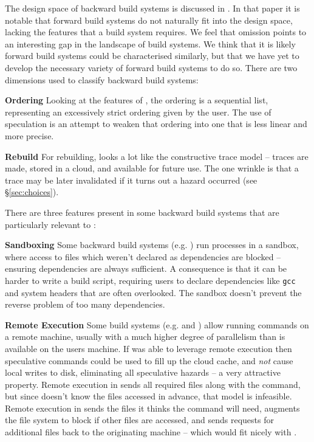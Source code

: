 The design space of backward build systems is discussed in \cite{build_systems_a_la_carte}. In that paper it is notable that forward build systems do not naturally fit into the design space, lacking the features that a build system requires. We feel that omission points to an interesting gap in the landscape of build systems. We think that it is likely forward build systems could be characterised similarly, but that we have yet to develop the necessary variety of forward build systems to do so. There are two dimensions used to classify backward build systems:

\textbf{Ordering} Looking at the features of \Rattle, the ordering is a sequential list, representing an excessively strict ordering given by the user. The use of speculation is an attempt to weaken that ordering into one that is less linear and more precise.

\textbf{Rebuild} For rebuilding, \Rattle looks a lot like the constructive trace model -- traces are made, stored in a cloud, and available for future use. The one wrinkle is that a trace may be later invalidated if it turns out a hazard occurred (see \S\ref{sec:choices}).

\postparagraphs

\noindent There are three features present in some backward build systems that are particularly relevant to \Rattle:

\textbf{Sandboxing} Some backward build systems (e.g. \Bazel \cite{bazel}) run processes in a sandbox, where access to files which weren't declared as dependencies are blocked -- ensuring dependencies are always sufficient. A consequence is that it can be harder to write a \Bazel build script, requiring users to declare dependencies like \texttt{gcc} and system headers that are often overlooked. The sandbox doesn't prevent the reverse problem of too many dependencies.

\textbf{Remote Execution} Some build systems (e.g. \Bazel and \BuildXL \cite{buildxl}) allow running commands on a remote machine, usually with a much higher degree of parallelism than is available on the users machine. If \Rattle was able to leverage remote execution then speculative commands could be used to fill up the cloud cache, and \emph{not} cause local writes to disk, eliminating all speculative hazards -- a very attractive property. Remote execution in \Bazel sends all required files along with the command, but since \Rattle doesn't know the files accessed in advance, that model is infeasible. Remote execution in \BuildXL sends the files it thinks the command will need, augments the file system to block if other files are accessed, and sends requests for additional files back to the originating machine -- which would fit nicely with \Rattle.

